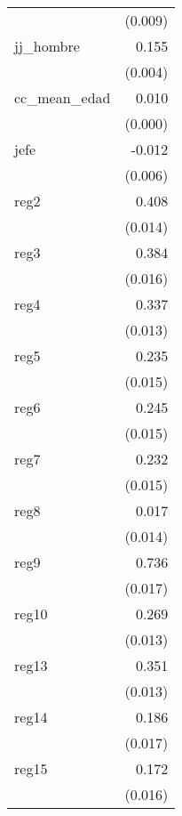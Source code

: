{\begin{longtable}{l*{1}{D{.}{.}{-1}}}
            &     (0.009)         \\
\addlinespace
jj\_hombre   &       0.155\sym{***}\\
            &     (0.004)         \\
\addlinespace
cc\_mean\_edad&       0.010\sym{***}\\
            &     (0.000)         \\
\addlinespace
jefe        &      -0.012\sym{*}  \\
            &     (0.006)         \\
\addlinespace
reg2        &       0.408\sym{***}\\
            &     (0.014)         \\
\addlinespace
reg3        &       0.384\sym{***}\\
            &     (0.016)         \\
\addlinespace
reg4        &       0.337\sym{***}\\
            &     (0.013)         \\
\addlinespace
reg5        &       0.235\sym{***}\\
            &     (0.015)         \\
\addlinespace
reg6        &       0.245\sym{***}\\
            &     (0.015)         \\
\addlinespace
reg7        &       0.232\sym{***}\\
            &     (0.015)         \\
\addlinespace
reg8        &       0.017         \\
            &     (0.014)         \\
\addlinespace
reg9        &       0.736\sym{***}\\
            &     (0.017)         \\
\addlinespace
reg10       &       0.269\sym{***}\\
            &     (0.013)         \\
\addlinespace
reg13       &       0.351\sym{***}\\
            &     (0.013)         \\
\addlinespace
reg14       &       0.186\sym{***}\\
            &     (0.017)         \\
\addlinespace
reg15       &       0.172\sym{***}\\
            &     (0.016)         \\

\end{longtable}}
